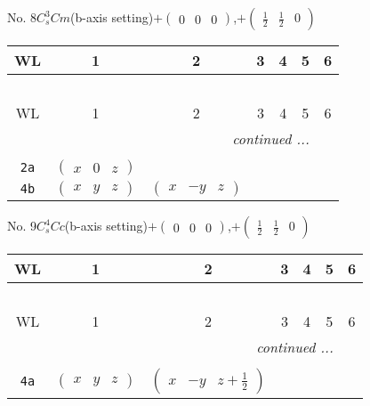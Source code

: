 \documentclass[fleqn,9pt,landscape]{jsarticle}
\begin{document}
\newpage
No. 8\quad$C_{s}^{3}$\quad$Cm$\quad(b-axis setting)\quad[ monoclinic ]\quad$+\begin{pmatrix} 0 & 0 & 0 \end{pmatrix}$,\quad $+\begin{pmatrix} \frac{1}{2} & \frac{1}{2} & 0 \end{pmatrix}$
\begin{center}
\renewcommand{\arraystretch}{1.2}
\begin{longtable}{ccccccc}
 \hline \hline
WL & 1 & 2 & 3 & 4 & 5 & 6 \\ \hline \endfirsthead

\multicolumn{6}{l}{\tablename\ \thetable{}} \\
 \hline \hline
WL & 1 & 2 & 3 & 4 & 5 & 6 \\ \hline \endhead

 \hline \hline
\multicolumn{6}{r}{\footnotesize\it continued ...} \\ \endfoot

 \hline \hline
\multicolumn{6}{r}{} \\ \endlastfoot

{\tt 2a} & $ \begin{pmatrix} x & 0 & z \end{pmatrix} $ & $  $ \\ \hline
{\tt 4b} & $ \begin{pmatrix} x & y & z \end{pmatrix} $ & $ \begin{pmatrix} x & - y & z \end{pmatrix} $ \\
\end{longtable}
\end{center}
\newpage
No. 9\quad$C_{s}^{4}$\quad$Cc$\quad(b-axis setting)\quad[ monoclinic ]\quad$+\begin{pmatrix} 0 & 0 & 0 \end{pmatrix}$,\quad $+\begin{pmatrix} \frac{1}{2} & \frac{1}{2} & 0 \end{pmatrix}$
\begin{center}
\renewcommand{\arraystretch}{1.2}
\begin{longtable}{ccccccc}
 \hline \hline
WL & 1 & 2 & 3 & 4 & 5 & 6 \\ \hline \endfirsthead

\multicolumn{6}{l}{\tablename\ \thetable{}} \\
 \hline \hline
WL & 1 & 2 & 3 & 4 & 5 & 6 \\ \hline \endhead

 \hline \hline
\multicolumn{6}{r}{\footnotesize\it continued ...} \\ \endfoot

 \hline \hline
\multicolumn{6}{r}{} \\ \endlastfoot

{\tt 4a} & $ \begin{pmatrix} x & y & z \end{pmatrix} $ & $ \begin{pmatrix} x & - y & z + \frac{1}{2} \end{pmatrix} $ \\
\end{longtable}
\end{center}
\end{document}

